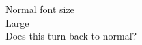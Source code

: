 \documentclass[a4paper]{article}
\begin{document}
Normal font size\\
\mbox{\Large Large}\\
Does this turn back to normal?
\end{document}

